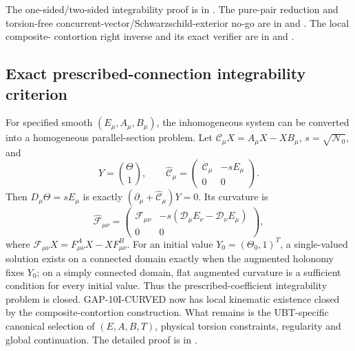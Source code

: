 \documentclass[12pt,a4paper]{article}
\theoremstyle{remark}\newtheorem{remark}[definition]{Remark}
\begin{document}
The one-sided/two-sided integrability proof is in
.  The
pure-pair reduction and torsion-free concurrent-vector/Schwarzschild-exterior
no-go are in
 and
.  The local composite-
contortion right inverse and its exact verifier are in
 and
.

\subsection{Exact prescribed-connection integrability criterion}
For specified smooth $(E_\mu,A_\mu,B_\mu)$, the inhomogeneous system can be
converted into a homogeneous parallel-section problem.  Let
$\mathcal C_\mu X=A_\mu X-XB_\mu$, $s=\sqrt{\mathcal N_0}$, and
\begin{equation}
 Y=\binom{\Theta}{1},\qquad
 \widehat{\mathcal C}_\mu=
 \begin{pmatrix}\mathcal C_\mu&-sE_\mu\\0&0\end{pmatrix}.
 \label{eq:augmented-paper}
\end{equation}
Then $D_\mu\Theta=sE_\mu$ is exactly
$(\partial_\mu+\widehat{\mathcal C}_\mu)Y=0$.  Its curvature is
\begin{equation}
 \widehat{\mathcal F}_{\mu\nu}=
 \begin{pmatrix}
 \mathcal F_{\mu\nu}&
 -s(\mathcal D_\mu E_\nu-\mathcal D_\nu E_\mu)\\0&0
 \end{pmatrix},
 \label{eq:augmented-curvature-paper}
\end{equation}
where $\mathcal F_{\mu\nu}X=F^A_{\mu\nu}X-XF^B_{\mu\nu}$.
For an initial value $Y_0=(\Theta_0,1)^T$, a single-valued solution exists on
a connected domain exactly when the augmented holonomy fixes $Y_0$; on a
simply connected domain, flat augmented curvature is a sufficient condition
for every initial value.  Thus the prescribed-coefficient integrability
problem is closed.  GAP-10I-CURVED now has local kinematic existence closed
by the composite-contortion construction.  What remains is the UBT-specific
canonical selection of $(E,A,B,T)$, physical torsion constraints, regularity
and global continuation.
The detailed proof is in
.
\end{document}
